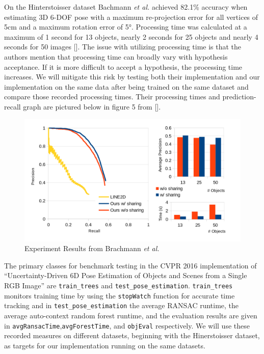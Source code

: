 \documentclass[12pt]{article}
\begin{document}
On the Hinterstoisser dataset Bachmann \emph{et al.} achieved 82.1\%
accuracy when estimating 3D 6-DOF pose with a maximum re-projection
error for all vertices of 5cm and a maximum rotation error of 5°.
Processing time was calculated at a maximum of 1 second for 13 objects,
nearly 2 seconds for 25 objects and nearly 4 seconds for 50 images
{[}{]}. The issue with utilizing processing time is that the authors
mention that processing time can broadly vary with hypothesis
acceptance. If it is more difficult to accept a hypothesis, the
processing time increases. We will mitigate this risk by testing both
their implementation and our implementation on the same data after being
trained on the same dataset and compare those recorded processing times.
Their processing times and prediction-recall graph are pictured below in
figure 5 from {[}{]}.

\begin{figure}
\centering
\includegraphics{Pictures/figure5.png}
\caption{Experiment Results from Brachmann \emph{et al.}}
\end{figure}

The primary classes for benchmark testing in the CVPR 2016
implementation of ``Uncertainty-Driven 6D Pose Estimation of Objects and
Scenes from a Single RGB Image'' are \texttt{train\_trees} and
\texttt{test\_pose\_estimation}. \texttt{train\_trees} monitors training
time by using the \texttt{stopWatch} function for accurate time tracking
and in \texttt{test\_pose\_estimation} the average RANSAC runtime, the
average auto-context random forest runtime, and the evaluation results
are given in \texttt{avgRansacTime},\texttt{avgForestTime}, and
\texttt{objEval} respectively. We will use these recorded measures on
different datasets, beginning with the Hinerstoisser dataset, as targets
for our implementation running on the same datasets.
\end{document}
